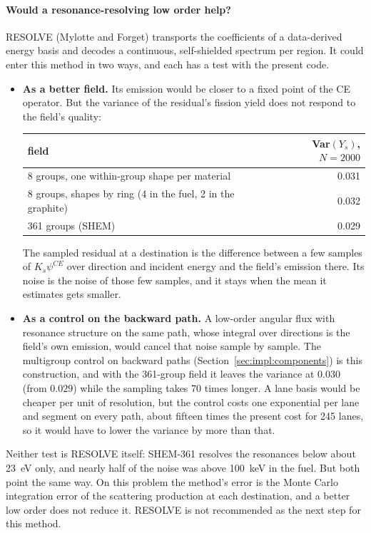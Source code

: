 \paragraph{Would a resonance-resolving low order help?} RESOLVE (Mylotte and Forget) transports the
coefficients of a data-derived energy basis and decodes a continuous, self-shielded spectrum per
region. It could enter this method in two ways, and each has a test with the present code.
\begin{itemize}
\item \textbf{As a better field.} Its emission would be closer to a fixed point of the CE operator.
  But the variance of the residual's fission yield does not respond to the field's quality:
  \begin{center}\small
  \begin{tabular}{@{}lr@{}}
  \toprule
  field & Var$(Y_s)$, $N=2000$\\
  \midrule
  8 groups, one within-group shape per material & 0.031\\
  8 groups, shapes by ring (4 in the fuel, 2 in the graphite) & 0.032\\
  361 groups (SHEM) & 0.029\\
  \bottomrule
  \end{tabular}
  \end{center}
  The sampled residual at a destination is the difference between a few samples of
  $K_s\psi^{CE}$ over direction and incident energy and the field's emission there. Its noise is
  the noise of those few samples, and it stays when the mean it estimates gets smaller.
\item \textbf{As a control on the backward path.} A low-order angular flux with resonance structure
  on the same path, whose integral over directions is the field's own emission, would cancel that
  noise sample by sample. The multigroup control on backward paths (Section~\ref{sec:impl:components}) is this
  construction, and with the 361-group field it leaves the variance at $0.030$ (from $0.029$) while
  the sampling takes 70 times longer. A lane basis would be cheaper per unit of resolution, but
  the control costs one exponential per lane and segment on every path, about fifteen times the
  present cost for 245 lanes, so it would have to lower the variance by more than that.
\end{itemize}
Neither test is RESOLVE itself: SHEM-361 resolves the resonances below about 23~eV only, and nearly
half of the noise was above 100~keV in the fuel. But both point the same way. On this problem the
method's error is the Monte Carlo integration error of the scattering production at each
destination, and a better low order does not reduce it. RESOLVE is not recommended as the next
step for this method.

